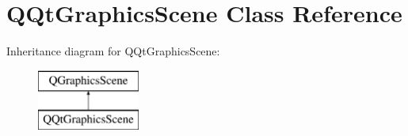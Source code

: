 \hypertarget{class_q_qt_graphics_scene}{}\section{Q\+Qt\+Graphics\+Scene Class Reference}
\label{class_q_qt_graphics_scene}
Inheritance diagram for Q\+Qt\+Graphics\+Scene\+:\begin{figure}[H]
\begin{center}
\leavevmode
\includegraphics[height=2.000000cm]{class_q_qt_graphics_scene}
\end{center}
\end{figure}
